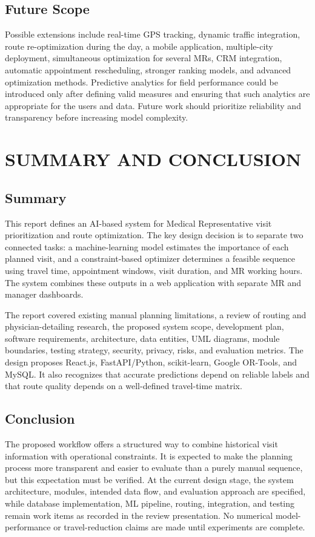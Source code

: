 \documentclass[12pt,a4paper,oneside]{report}
\begin{document}
\section{Future Scope}
Possible extensions include real-time GPS tracking, dynamic traffic integration, route re-optimization during the day, a mobile application, multiple-city deployment, simultaneous optimization for several MRs, CRM integration, automatic appointment rescheduling, stronger ranking models, and advanced optimization methods. Predictive analytics for field performance could be introduced only after defining valid measures and ensuring that such analytics are appropriate for the users and data. Future work should prioritize reliability and transparency before increasing model complexity.

\chapter{SUMMARY AND CONCLUSION}

\section{Summary}
This report defines an AI-based system for Medical Representative visit prioritization and route optimization. The key design decision is to separate two connected tasks: a machine-learning model estimates the importance of each planned visit, and a constraint-based optimizer determines a feasible sequence using travel time, appointment windows, visit duration, and MR working hours. The system combines these outputs in a web application with separate MR and manager dashboards.

The report covered existing manual planning limitations, a review of routing and physician-detailing research, the proposed system scope, development plan, software requirements, architecture, data entities, UML diagrams, module boundaries, testing strategy, security, privacy, risks, and evaluation metrics. The design proposes React.js, FastAPI/Python, scikit-learn, Google OR-Tools, and MySQL. It also recognizes that accurate predictions depend on reliable labels and that route quality depends on a well-defined travel-time matrix.

\section{Conclusion}
The proposed workflow offers a structured way to combine historical visit information with operational constraints. It is expected to make the planning process more transparent and easier to evaluate than a purely manual sequence, but this expectation must be verified. At the current design stage, the system architecture, modules, intended data flow, and evaluation approach are specified, while database implementation, ML pipeline, routing, integration, and testing remain work items as recorded in the review presentation. No numerical model-performance or travel-reduction claims are made until experiments are complete.
\end{document}

